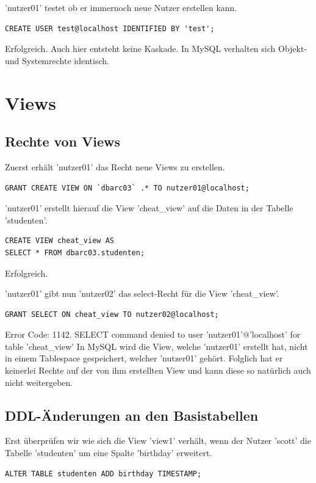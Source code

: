 \documentclass[10pt]{scrreprt}
\begin{document}
'nutzer01' testet ob er immernoch neue Nutzer erstellen kann.
\begin{lstlisting}[style=sql]
CREATE USER test@localhost IDENTIFIED BY 'test';
\end{lstlisting}
Erfolgreich.
\newline\newline
Auch hier entsteht keine Kaskade. In MySQL verhalten sich Objekt- und Systemrechte identisch.

\section{Views}
\subsection{Rechte von Views}
Zuerst erhält 'nutzer01' das Recht neue Views zu erstellen.
\begin{lstlisting}[style=sql]
GRANT CREATE VIEW ON `dbarc03` .* TO nutzer01@localhost;
\end{lstlisting}

'nutzer01' erstellt hierauf die View 'cheat\_view' auf die Daten in der Tabelle 'studenten'.
\begin{lstlisting}[style=sql]
CREATE VIEW cheat_view AS
SELECT * FROM dbarc03.studenten;
\end{lstlisting}
Erfolgreich.

'nutzer01' gibt nun 'nutzer02' das select-Recht für die View 'cheat\_view'.
\begin{lstlisting}[style=sql]
GRANT SELECT ON cheat_view TO nutzer02@localhost;
\end{lstlisting}
Error Code: 1142. SELECT command denied to user 'nutzer01'@'localhost' for table 'cheat\_view'\newline\newline
In MySQL wird die View, welche 'nutzer01' erstellt hat, nicht in einem Tablespace gespeichert, welcher 'nutzer01' gehört. Folglich hat er keinerlei Rechte auf der von ihm erstellten View und kann diese so natürlich auch nicht weitergeben.

\subsection{DDL-Änderungen an den Basistabellen}
Erst überprüfen wir wie sich die View 'view1' verhält, wenn der Nutzer 'scott' die Tabelle 'studenten' um eine Spalte 'birthday' erweitert.
\begin{lstlisting}[style=sql]
ALTER TABLE studenten ADD birthday TIMESTAMP;
\end{lstlisting}
\end{document}
